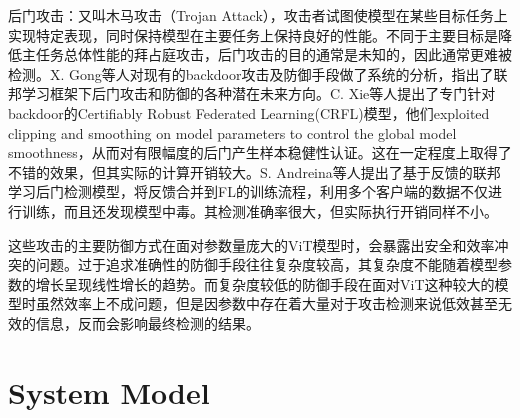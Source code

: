 \documentclass[conference]{IEEEtran}
\begin{document}
后门攻击：又叫木马攻击（Trojan Attack），攻击者试图使模型在某些目标任务上实现特定表现，同时保持模型在主要任务上保持良好的性能\cite{canYouBackdoor}。不同于主要目标是降低主任务总体性能的拜占庭攻击，后门攻击的目的通常是未知的，因此通常更难被检测。X. Gong等人对现有的backdoor攻击及防御手段做了系统的分析，指出了联邦学习框架下后门攻击和防御的各种潜在未来方向\cite{backdoorAndDefense}。C. Xie等人提出了专门针对backdoor的Certifiably Robust Federated Learning(CRFL)模型，他们exploited clipping and smoothing on model parameters to control the global model smoothness，从而对有限幅度的后门产生样本稳健性认证\cite{backdoorAndDefense_robust}。这在一定程度上取得了不错的效果，但其实际的计算开销较大。S. Andreina等人提出了基于反馈的联邦学习后门检测模型，将反馈合并到FL的训练流程，利用多个客户端的数据不仅进行训练，而且还发现模型中毒\cite{backdoorAndDefense_feedback}。其检测准确率很大，但实际执行开销同样不小。

这些攻击的主要防御方式在面对参数量庞大的ViT模型时，会暴露出安全和效率冲突的问题。过于追求准确性的防御手段往往复杂度较高，其复杂度不能随着模型参数的增长呈现线性增长的趋势。而复杂度较低的防御手段在面对ViT这种较大的模型时虽然效率上不成问题，但是因参数中存在着大量对于攻击检测来说低效甚至无效的信息，反而会影响最终检测的结果。










\section{System Model}

\label{sec:model}

\end{document}
